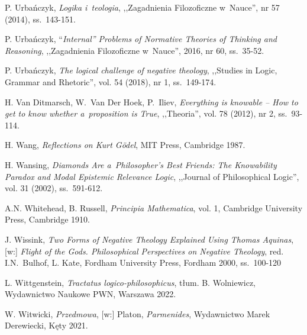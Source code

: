 \begin{thebibliography}{100}
P. Urbańczyk, \textit{Logika i~teologia}, ,,Zagadnienia Filozoficzne w~Nauce'', nr 57 (2014), ss.~143-151.

P. Urbańczyk, ``\textit{Internal'' Problems of Normative Theories of Thinking and Reasoning}, ,,Zagadnienia Filozoficzne w~Nauce'', 2016, nr 60, ss.~35-52.

P. Urbańczyk, \textit{The logical challenge of negative theology}, ,,Studies in Logic, Grammar and Rhetoric'', vol. 54 (2018), nr 1, ss.~149-174.


H. Van Ditmarsch, W.~Van Der Hoek, P.~Iliev, \textit{Everything is knowable -- How to get to know whether a~proposition is True}, ,,Theoria'', vol. 78 (2012), nr 2, ss.~93-114.

H. Wang, \textit{Reflections on Kurt Gödel}, MIT Press, Cambridge 1987.



H. Wansing, \textit{Diamonds Are a~Philosopher's Best Friends: The Knowability Paradox and Modal Epistemic Relevance Logic}, ,,Journal of Philosophical Logic'', vol. 31 (2002), ss.~591-612.

A.N. Whitehead, B. Russell, \textit{Principia Mathematica}, vol. 1, Cambridge University Press, Cambridge 1910.

J. Wissink, \textit{Two Forms of Negative Theology Explained Using Thomas Aquinas}, [w:]
 \textit{Flight of the Gods. Philosophical Perspectives on Negative Theology}, red. I.N.~Bulhof, L. Kate, Fordham University Press, Fordham 2000, ss.~100-120

L. Wittgenstein, \textit{Tractatus logico-philosophicus}, tłum. B. Wolniewicz, Wydawnictwo Naukowe PWN, Warszawa 2022.

W. Witwicki, \textit{Przedmowa}, [w:] Platon, \textit{Parmenides}, Wydawnictwo Marek Derewiecki, Kęty 2021.


\end{thebibliography}
